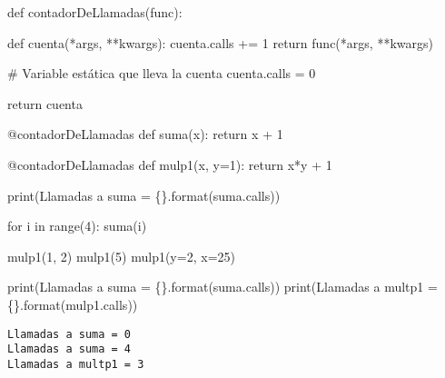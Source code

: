 \documentclass[
  letterpaper,
  DIV=11,
  numbers=noendperiod]{scrreprt}
\newenvironment{Shaded}{\begin{snugshade}}{\end{snugshade}}
\newcommand{\AttributeTok}[1]{\textcolor[rgb]{0.40,0.45,0.13}{#1}}
\newcommand{\BuiltInTok}[1]{\textcolor[rgb]{0.00,0.23,0.31}{#1}}
\newcommand{\CommentTok}[1]{\textcolor[rgb]{0.37,0.37,0.37}{#1}}
\newcommand{\ControlFlowTok}[1]{\textcolor[rgb]{0.00,0.23,0.31}{#1}}
\newcommand{\DecValTok}[1]{\textcolor[rgb]{0.68,0.00,0.00}{#1}}
\newcommand{\KeywordTok}[1]{\textcolor[rgb]{0.00,0.23,0.31}{#1}}
\newcommand{\NormalTok}[1]{\textcolor[rgb]{0.00,0.23,0.31}{#1}}
\newcommand{\OperatorTok}[1]{\textcolor[rgb]{0.37,0.37,0.37}{#1}}
\newcommand{\SpecialCharTok}[1]{\textcolor[rgb]{0.37,0.37,0.37}{#1}}
\newcommand{\StringTok}[1]{\textcolor[rgb]{0.13,0.47,0.30}{#1}}
\begin{document}
\begin{Shaded}
\begin{Highlighting}[]
\KeywordTok{def}\NormalTok{ contadorDeLlamadas(func):}
    
    \KeywordTok{def}\NormalTok{ cuenta(}\OperatorTok{*}\NormalTok{args, }\OperatorTok{**}\NormalTok{kwargs):}
\NormalTok{        cuenta.calls }\OperatorTok{+=} \DecValTok{1}
        \ControlFlowTok{return}\NormalTok{ func(}\OperatorTok{*}\NormalTok{args, }\OperatorTok{**}\NormalTok{kwargs)}
        
    \CommentTok{\# Variable estática que lleva la cuenta}
\NormalTok{    cuenta.calls }\OperatorTok{=} \DecValTok{0}
    
    \ControlFlowTok{return}\NormalTok{ cuenta}

\AttributeTok{@contadorDeLlamadas}
\KeywordTok{def}\NormalTok{ suma(x):}
    \ControlFlowTok{return}\NormalTok{ x }\OperatorTok{+} \DecValTok{1}

\AttributeTok{@contadorDeLlamadas}
\KeywordTok{def}\NormalTok{ mulp1(x, y}\OperatorTok{=}\DecValTok{1}\NormalTok{):}
    \ControlFlowTok{return}\NormalTok{ x}\OperatorTok{*}\NormalTok{y }\OperatorTok{+} \DecValTok{1}

\BuiltInTok{print}\NormalTok{(}\StringTok{\textquotesingle{}Llamadas a suma = }\SpecialCharTok{\{\}}\StringTok{\textquotesingle{}}\NormalTok{.}\BuiltInTok{format}\NormalTok{(suma.calls))}

\ControlFlowTok{for}\NormalTok{ i }\KeywordTok{in} \BuiltInTok{range}\NormalTok{(}\DecValTok{4}\NormalTok{):}
\NormalTok{    suma(i)}
    
\NormalTok{mulp1(}\DecValTok{1}\NormalTok{, }\DecValTok{2}\NormalTok{)}
\NormalTok{mulp1(}\DecValTok{5}\NormalTok{)}
\NormalTok{mulp1(y}\OperatorTok{=}\DecValTok{2}\NormalTok{, x}\OperatorTok{=}\DecValTok{25}\NormalTok{)}

\BuiltInTok{print}\NormalTok{(}\StringTok{\textquotesingle{}Llamadas a suma = }\SpecialCharTok{\{\}}\StringTok{\textquotesingle{}}\NormalTok{.}\BuiltInTok{format}\NormalTok{(suma.calls))}
\BuiltInTok{print}\NormalTok{(}\StringTok{\textquotesingle{}Llamadas a multp1 = }\SpecialCharTok{\{\}}\StringTok{\textquotesingle{}}\NormalTok{.}\BuiltInTok{format}\NormalTok{(mulp1.calls))}
\end{Highlighting}
\end{Shaded}

\begin{verbatim}
Llamadas a suma = 0
Llamadas a suma = 4
Llamadas a multp1 = 3
\end{verbatim}
\end{document}
